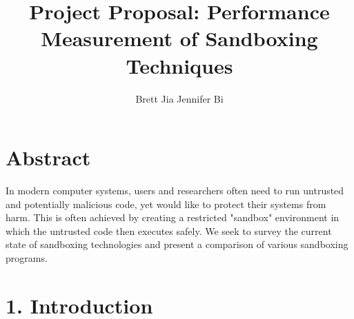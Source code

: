 \documentclass{proc}
\begin{document}
\title{Project Proposal: Performance Measurement of Sandboxing Techniques}

\author{Brett Jia \hspace{1em} Jennifer Bi}

\maketitle

\section*{Abstract}

In modern computer systems, users and researchers often need to run untrusted and potentially malicious code, yet would like to protect their systems from harm. This is often achieved by creating a restricted "sandbox" environment in which the untrusted code then executes safely. We seek to survey the current state of sandboxing technologies and present a comparison of various sandboxing programs.

\section*{1. Introduction}
\end{document}
